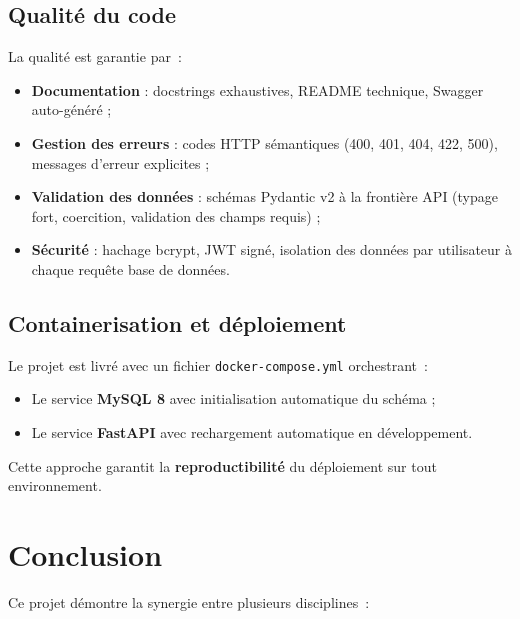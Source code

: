 \documentclass[12pt, a4paper]{article}
\begin{document}
\subsection{Qualité du code}

La qualité est garantie par~:

\begin{itemize}
  \item \textbf{Documentation} : docstrings exhaustives, README technique, Swagger auto-généré ;
  \item \textbf{Gestion des erreurs} : codes HTTP sémantiques (400, 401, 404, 422, 500), messages d'erreur explicites ;
  \item \textbf{Validation des données} : schémas Pydantic v2 à la frontière API (typage fort, coercition, validation des champs requis) ;
  \item \textbf{Sécurité} : hachage bcrypt, JWT signé, isolation des données par utilisateur à chaque requête base de données.
\end{itemize}

\subsection{Containerisation et déploiement}

Le projet est livré avec un fichier \texttt{docker-compose.yml} orchestrant~:
\begin{itemize}
  \item Le service \textbf{MySQL 8} avec initialisation automatique du schéma ;
  \item Le service \textbf{FastAPI} avec rechargement automatique en développement.
\end{itemize}

Cette approche garantit la \textbf{reproductibilité} du déploiement sur tout environnement.

\section{Conclusion}

Ce projet démontre la synergie entre plusieurs disciplines~:
\end{document}
